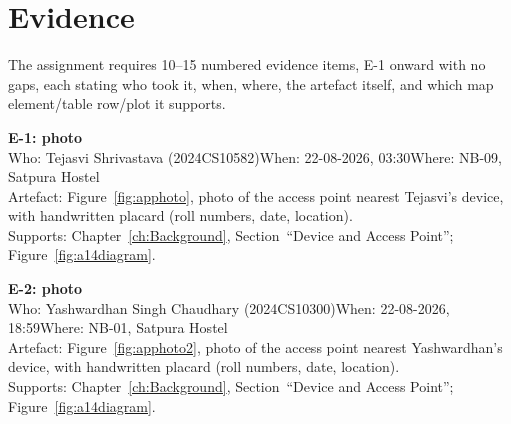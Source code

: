 \chapter{Evidence}\label{ch:Evaluation}

The assignment requires 10--15 numbered evidence items, E-1 onward with no gaps, each stating
who took it, when, where, the artefact itself, and which map element/table row/plot it
supports.

\textbf{E-1: photo}\\
Who: Tejasvi Shrivastava (2024CS10582)\quad When: 22-08-2026, 03:30\quad Where: NB-09, Satpura Hostel\\
Artefact: Figure~\ref{fig:apphoto}, photo of the access point nearest Tejasvi's device, with
handwritten placard (roll numbers, date, location).\\
Supports: Chapter~\ref{ch:Background}, Section~``Device and Access Point''; Figure~\ref{fig:a14diagram}.

\textbf{E-2: photo}\\
Who: Yashwardhan Singh Chaudhary (2024CS10300)\quad When: 22-08-2026, 18:59\quad Where: NB-01, Satpura Hostel\\
Artefact: Figure~\ref{fig:apphoto2}, photo of the access point nearest Yashwardhan's device,
with handwritten placard (roll numbers, date, location).\\
Supports: Chapter~\ref{ch:Background}, Section~``Device and Access Point''; Figure~\ref{fig:a14diagram}.

